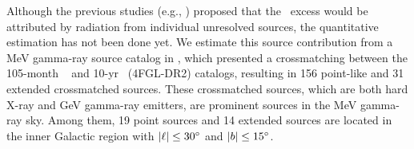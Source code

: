 \documentclass[a4paper,11pt]{article}
\begin{document}
Although the previous studies (e.g., \cite{strong_diffuse_1996,orlando_imprints_2018,siegert_diffuse_2022}) proposed that the \comptel\ excess would be attributed by radiation from individual unresolved sources,
the quantitative estimation has not been done yet.
We estimate this source contribution from a MeV gamma-ray source catalog in \cite{tsuji_cross-match_2021}, which presented a crossmatching between the 105-month \bat\ \citep{Bird2016} and 10-yr \lat\ (4FGL-DR2) \cite{4fgldr2} catalogs, resulting in 156 point-like and 31 extended crossmatched sources.
These crossmatched sources, which are both hard X-ray and GeV gamma-ray emitters, are prominent sources in the MeV gamma-ray sky.
%
Among them,
19 point sources and 14 extended sources are located in the inner Galactic region with $|\ell| \leq 30\hbox{$^\circ$}$ and $|b| \leq 15\hbox{$^\circ$}$.
\end{document}

